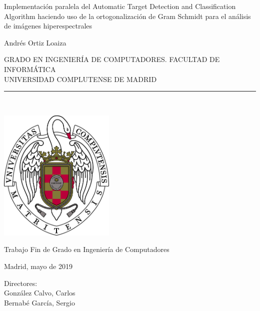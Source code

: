 
\newpage


\thispagestyle{empty}


\begin{center}

   \vspace{1cm}


   {\Large Implementación paralela del Automatic Target Detection and Classification Algorithm haciendo uso de la ortogonalización de Gram Schmidt para el análisis de imágenes hiperespectrales}\\

   \vspace{1.5cm}

   {\large Andrés Ortiz Loaiza}\\

   \vspace{1.5cm}

   GRADO EN INGENIERÍA  DE COMPUTADORES. FACULTAD DE INFORMÁTICA\\ 
   UNIVERSIDAD COMPLUTENSE DE MADRID \\


   \vspace{0.65cm}
   \rule{2in}{0.5pt}\\
   \vspace{0.85cm}

  \includegraphics[height=2.5in]{figures/escudo2.jpg}
  
   \vspace{0.5cm}
Trabajo Fin de Grado en Ingeniería de Computadores

   \vspace{0.5cm}

  Madrid, mayo de 2019\\
   \vspace{3cm}

\end{center}

{\raggedleft
Directores:\\
   \vspace{ 0.5cm}
González Calvo, Carlos\\
Bernabé García, Sergio\\
}